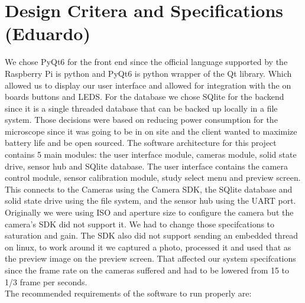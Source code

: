 \section{Design Critera and Specifications (Eduardo)}
We chose PyQt6 for the front end since the official language supported by the Raspberry Pi is python and PyQt6 is python wrapper of the Qt library. Which allowed us to display our user interface and allowed for integration with the on boards buttons and LEDS. For the database we chose SQlite for the backend since it is a single threaded database that can be backed up locally in a file system. Those decisions were based on reducing power consumption for the microscope since it was going to be in on site and the client wanted to maximize battery life and be open sourced. The software architecture for this project contains 5 main modules: the user interface module, cameras module, solid state drive, sensor hub and SQlite database. The user interface contains the camera control module, sensor calibration module, study select menu and preview screen. This connects to the Cameras using the Camera SDK, the SQlite database and solid state drive using the file system, and the sensor hub using the UART port. 
\\ Originally we were using ISO and aperture size to configure the camera but the camera's SDK did not support it. We had to change those specifcations to saturation and gain. The SDK also did not support sending an embedded thread on linux, to work around it we captured a photo, processed it and used that as the preview image on the preview screen. That affected our system specifcations since the frame rate on the cameras suffered and had to be lowered from 15 to 1/3 frame per seconds. \\
The recommended requirements of the software to run properly are: 
